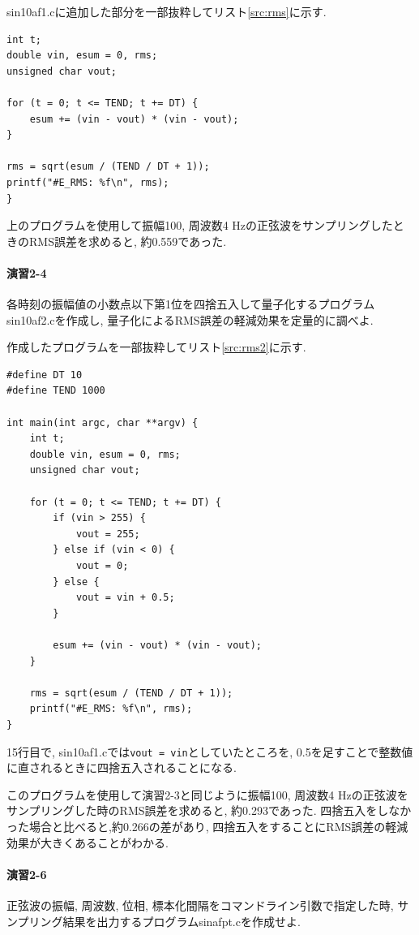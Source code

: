 \documentclass[titlepage]{jsarticle}
\begin{document}
        sin10af1.cに追加した部分を一部抜粋してリスト\ref{src:rms}に示す.
        

        \begin{lstlisting}[caption=sin10af1.c, label=src:rms]
int t;
double vin, esum = 0, rms;
unsigned char vout;

for (t = 0; t <= TEND; t += DT) {
    esum += (vin - vout) * (vin - vout);
}

rms = sqrt(esum / (TEND / DT + 1));
printf("#E_RMS: %f\n", rms);
}\end{lstlisting}

        上のプログラムを使用して振幅100, 周波数4 Hzの正弦波をサンプリングしたときのRMS誤差を求めると,
        約0.559であった.

    \paragraph{演習2-4} 各時刻の振幅値の小数点以下第1位を四捨五入して量子化するプログラムsin10af2.cを作成し,
    量子化によるRMS誤差の軽減効果を定量的に調べよ.

        作成したプログラムを一部抜粋してリスト\ref{src:rms2}に示す.

        \begin{lstlisting}[caption=sin10af2.c, label=src:rms2]
#define DT 10
#define TEND 1000

int main(int argc, char **argv) {
    int t;
    double vin, esum = 0, rms;
    unsigned char vout;

    for (t = 0; t <= TEND; t += DT) {
        if (vin > 255) {
            vout = 255;
        } else if (vin < 0) {
            vout = 0;
        } else {
            vout = vin + 0.5;
        }

        esum += (vin - vout) * (vin - vout);
    }

    rms = sqrt(esum / (TEND / DT + 1));
    printf("#E_RMS: %f\n", rms);
}\end{lstlisting}

        15行目で, sin10af1.cでは\verb|vout = vin|としていたところを,
        0.5を足すことで整数値に直されるときに四捨五入されることになる.

        このプログラムを使用して演習2-3と同じように振幅100, 周波数4 Hzの正弦波をサンプリングした時のRMS誤差を求めると,
        約0.293であった.
        四捨五入をしなかった場合と比べると,約0.266の差があり,
        四捨五入をすることにRMS誤差の軽減効果が大きくあることがわかる.

    \paragraph{演習2-6} 正弦波の振幅, 周波数, 位相, 標本化間隔をコマンドライン引数で指定した時,
    サンプリング結果を出力するプログラムsinafpt.cを作成せよ.
\end{document}
